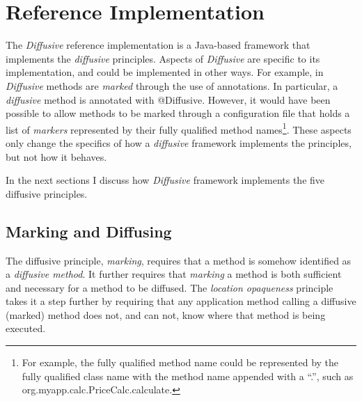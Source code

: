 \documentclass[11pt]{article}
\begin{document}
%
%
\section{Reference Implementation\label{sec:reference_implementation}}
The \emph{Diffusive} reference implementation is a Java-based framework that implements the \emph{diffusive} principles. Aspects of \emph{Diffusive} are specific to its implementation, and could be implemented in other ways. For example, in \emph{Diffusive} methods are \emph{marked} through the use of annotations. In particular, a \emph{diffusive} method is annotated with \textsf{@Diffusive}. However, it would have been possible to allow methods to be marked through a configuration file that holds a list of \emph{markers} represented by their fully qualified method names\footnote{For example, the fully qualified method name could be represented by the fully qualified class name with the method name appended with a ``.'', such as \textsf{org.myapp.calc.PriceCalc.calculate}.}. These aspects only change the specifics of how a \emph{diffusive} framework implements the principles, but not how it behaves.

In the next sections I discuss how \emph{Diffusive} framework implements the five diffusive principles.

\subsection{Marking and Diffusing\label{sec:marking_and_diffusing}}
The diffusive principle, \emph{marking}, requires that a method is somehow identified as a \emph{diffusive method}. It further requires that \emph{marking} a method is both sufficient and necessary for a method to be diffused. The \emph{location opaqueness} principle takes it a step further by requiring that any application method calling a diffusive (marked) method does not, and can not, know where that method is being executed.

\end{document}

